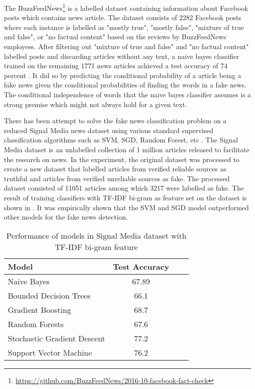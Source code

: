 The BuzzFeedNews\footnote{\url{https://github.com/BuzzFeedNews/2016-10-facebook-fact-check}} is a labelled dataset containing information about Facebook posts which contains news article. The dataset consists of 2282 Facebook posts where each instance is labelled as "mostly true", "mostly false", "mixture of true and false", or "no factual content" based on the reviews by BuzzFeedNews employees.  After filtering out "mixture of true and false" and "no factual content" labelled posts and discarding articles without any text, a naive bayes classifier trained on the remaining 1771 news articles achieved a test accuracy of 74 percent \cite{granik2017fake}. It did so by predicting the conditional probability of a article being a fake news given the conditional probabilities of finding the words in a fake news. The conditional independence of words that the naive bayes classifier assumes is a strong premise which might not always hold for a given text.

There has been attempt to solve the fake news classification problem on a reduced Signal Media news dataset\cite{corney2016million} using various standard supervised classification algorithms such as SVM, SGD, Random Forest, etc \cite{gilda2017evaluating}. The Signal Media dataset is an unlabelled collection of 1 million articles released to facilitate the research on news. In the experiment, the original dataset was processed to create a new dataset that labelled articles from verified reliable sources as truthful and articles from verified unreliable sources as fake. The processed dataset consisted of 11051 articles among which 3217 were labelled as fake. The result of training classifiers with TF-IDF bi-gram as feature set on the dataset is shown in   \cite{gilda2017evaluating}. It was empirically shown that the SVM and SGD model outperformed other models for the fake news detection.

\begin{table}[h]
\begin{center}
\caption{Performance of models in Signal Media dataset with TF-IDF bi-gram feature}
\label{tbl:signal_media_performance}
\begin{tabular}{@{}lccc@{}}
\toprule 
\rule[-1pt]{0pt}{14pt}Model&Test Accuracy\\
\midrule 
\rule[-1pt]{0pt}{14pt}Naive Bayes&67.89\\
\rule[-1pt]{0pt}{14pt}Bounded Decision Trees&66.1\\
\rule[-1pt]{0pt}{14pt}Gradient Boosting&68.7\\
\rule[-1pt]{0pt}{14pt}Random Forests&67.6\\
\rule[-1pt]{0pt}{14pt}Stochastic Gradient Descent&77.2\\
\rule[-1pt]{0pt}{14pt}Support Vector Machine&76.2\\
\bottomrule
\end{tabular}
\end{center}
\end{table}

